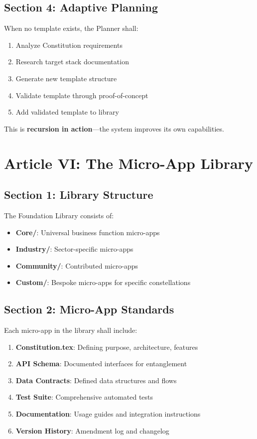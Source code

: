 \documentclass[12pt,letterpaper]{article}
\begin{document}
\subsection{Section 4: Adaptive Planning}

When no template exists, the Planner shall:

\begin{enumerate}
    \item Analyze Constitution requirements
    \item Research target stack documentation
    \item Generate new template structure
    \item Validate template through proof-of-concept
    \item Add validated template to library
\end{enumerate}

This is \textbf{recursion in action}—the system improves its own capabilities.

\section{Article VI: The Micro-App Library}

\subsection{Section 1: Library Structure}

The Foundation Library consists of:

\begin{itemize}
    \item \textbf{Core/}: Universal business function micro-apps
    \item \textbf{Industry/}: Sector-specific micro-apps
    \item \textbf{Community/}: Contributed micro-apps
    \item \textbf{Custom/}: Bespoke micro-apps for specific constellations
\end{itemize}

\subsection{Section 2: Micro-App Standards}

Each micro-app in the library shall include:

\begin{enumerate}
    \item \textbf{Constitution.tex}: Defining purpose, architecture, features
    \item \textbf{API Schema}: Documented interfaces for entanglement
    \item \textbf{Data Contracts}: Defined data structures and flows
    \item \textbf{Test Suite}: Comprehensive automated tests
    \item \textbf{Documentation}: Usage guides and integration instructions
    \item \textbf{Version History}: Amendment log and changelog
\end{enumerate}
\end{document}
